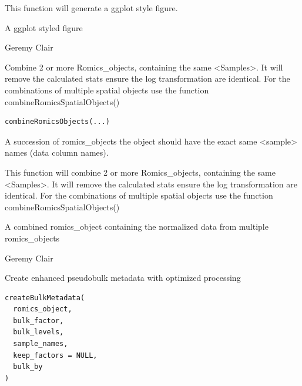 \documentclass[a4paper]{book}
\begin{document}
%
\begin{Details}
This function will generate a ggplot style figure.
\end{Details}
%
\begin{Value}
A ggplot styled figure
\end{Value}
%
\begin{Author}
Geremy Clair
\end{Author}
%
\begin{Description}
Combine 2 or more Romics\_objects, containing the same <Samples>. It will remove the calculated stats ensure the log transformation are identical. For the combinations of multiple spatial objects use the function combineRomicsSpatialObjects()
\end{Description}
%
\begin{Usage}
\begin{verbatim}
combineRomicsObjects(...)
\end{verbatim}
\end{Usage}
%
\begin{Arguments}
\begin{ldescription}
\item[\code{...}] A succession of romics\_objects the object should have the exact same <sample> names (data column names).
\end{ldescription}
\end{Arguments}
%
\begin{Details}
This function will combine 2 or more Romics\_objects, containing the same <Samples>. It will remove the calculated stats ensure the log transformation are identical. For the combinations of multiple spatial objects use the function combineRomicsSpatialObjects()
\end{Details}
%
\begin{Value}
A combined romics\_object containing the normalized data from multiple romics\_objects
\end{Value}
%
\begin{Author}
Geremy Clair
\end{Author}
%
\begin{Description}
Create enhanced pseudobulk metadata with optimized processing
\end{Description}
%
\begin{Usage}
\begin{verbatim}
createBulkMetadata(
  romics_object,
  bulk_factor,
  bulk_levels,
  sample_names,
  keep_factors = NULL,
  bulk_by
)
\end{verbatim}
\end{Usage}
\end{document}
